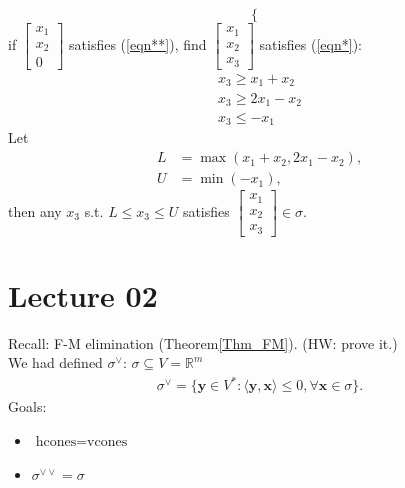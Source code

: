 \documentclass[a4paper,12pt]{amsart}
\newcommand{\RR}{\mathbb{R}}
\newcommand{\bfx}{\mathbf{x}}
\newcommand{\bfy}{\mathbf{y}}
\begin{document}
\begin{Eg}
\begin{equation}
\begin{cases}
\end{cases}
\end{equation}
if $\begin{bmatrix}
x_1\\
x_2\\
0
\end{bmatrix}$ satisfies (\ref{eqn**}), find $\begin{bmatrix}
x_1\\
x_2\\
x_3
\end{bmatrix}$ satisfies (\ref{eqn*}):
\begin{align*}
x_3\geq x_1+x_2\\
x_3\geq 2x_1-x_2\\
x_3\leq -x_1
\end{align*}
Let 
\begin{align*}
L&=\max(x_1+x_2,2x_1-x_2),\\
U&=\min(-x_1),
\end{align*}
then any $x_3$ s.t. $L\leq x_3\leq U$ satisfies $\begin{bmatrix}
x_1\\x_2\\x_3
\end{bmatrix}\in\sigma$.
\end{Eg}

\newpage
\section{Lecture 02}
Recall: F-M elimination (Theorem\ref{Thm_FM}). (HW: prove it.)\\
We had defined $\sigma^{\vee}$: $\sigma\subseteq V=\RR^m$
\begin{align*}
\sigma^{\vee}=\{\bfy\in V^{*}:\langle \bfy,\bfx\rangle\leq 0, \forall \bfx\in\sigma\}.
\end{align*} 
Goals: 
\begin{itemize}
\item $\text{hcones}=\text{vcones}$
\item $\sigma^{\vee\vee}=\sigma$
\end{itemize}
\end{document}
